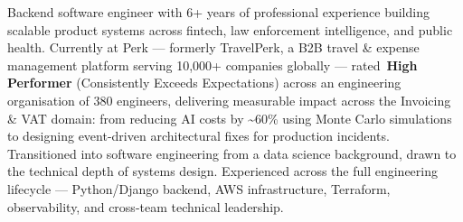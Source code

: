 \newline
\newline
\begin{cvparagraph}
Backend software engineer with 6+ years of professional experience building scalable product systems across fintech, law enforcement intelligence, and public health. Currently at Perk — formerly TravelPerk, a B2B travel \& expense management platform serving 10,000+ companies globally — rated~\textbf{High Performer} (Consistently Exceeds Expectations) across an engineering organisation of 380 engineers, delivering measurable impact across the Invoicing \& VAT domain: from reducing AI costs by \textasciitilde60\% using Monte Carlo simulations to designing event-driven architectural fixes for production incidents. Transitioned into software engineering from a data science background, drawn to the technical depth of systems design. Experienced across the full engineering lifecycle — Python/Django backend, AWS infrastructure, Terraform, observability, and cross-team technical leadership.
\end{cvparagraph}
